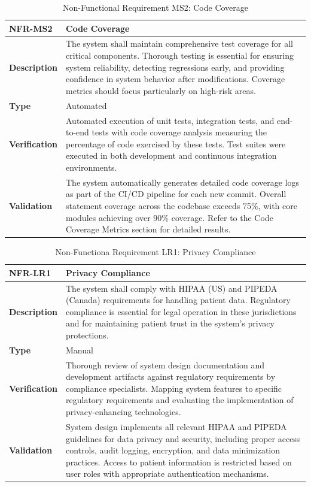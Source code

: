 \documentclass[12pt, titlepage]{article}
\begin{document}
\begin{table}[h!]
\centering
{}
\begin{tabular}{|p{3.5cm}|p{11.5cm}|}
\hline
\rowcolor{gray!30}
\textbf{NFR-MS2} & \textbf{Code Coverage} \\
\hline
\textbf{Description} & The system shall maintain comprehensive test coverage for all critical components. Thorough testing is essential for ensuring system reliability, detecting regressions early, and providing confidence in system behavior after modifications. Coverage metrics should focus particularly on high-risk areas. \\
\hline
\textbf{Type} & Automated \\
\hline
\textbf{Verification} & Automated execution of unit tests, integration tests, and end-to-end tests with code coverage analysis measuring the percentage of code exercised by these tests. Test suites were executed in both development and continuous integration environments. \\
\hline
\textbf{Validation} & The system automatically generates detailed code coverage logs as part of the CI/CD pipeline for each new commit. Overall statement coverage across the codebase exceeds 75\%, with core modules achieving over 90\% coverage. Refer to the Code Coverage Metrics section for detailed results. \\
\hline
\end{tabular}
\caption{Non-Functional Requirement MS2: Code Coverage}
\end{table}

\begin{table}[h!]
\centering
{}
\begin{tabular}{|p{3.5cm}|p{11.5cm}|}
\hline
\rowcolor{gray!30}
\textbf{NFR-LR1} & \textbf{Privacy Compliance} \\
\hline
\textbf{Description} & The system shall comply with HIPAA (US) and PIPEDA (Canada) requirements for handling patient data. Regulatory compliance is essential for legal operation in these jurisdictions and for maintaining patient trust in the system's privacy protections. \\
\hline
\textbf{Type} & Manual \\
\hline
\textbf{Verification} & Thorough review of system design documentation and development artifacts against regulatory requirements by compliance specialists. Mapping system features to specific regulatory requirements and evaluating the implementation of privacy-enhancing technologies. \\
\hline
\textbf{Validation} & System design implements all relevant HIPAA and PIPEDA guidelines for data privacy and security, including proper access controls, audit logging, encryption, and data minimization practices. Access to patient information is restricted based on user roles with appropriate authentication mechanisms. \\
\hline
\end{tabular}
\caption{Non-Functiona Requirement LR1: Privacy Compliance}
\end{table}
\end{document}
